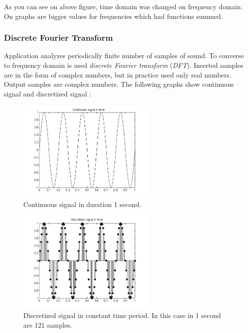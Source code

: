 \documentclass[11pt,titlepage]{article}
\theoremstyle{plain}
\begin{document}
As you can see on above figure, time domain was changed on frequency domain. On graphs are bigger values for frequencies which had functions summed.

\subsubsection{Discrete Fourier Transform}
Application analyzes periodically finite number of samples of sound. To converse to frequency domain is used \textit{discrete Fourier transform} (\textit{DFT}). Inserted samples are in the form of complex numbers, but in practice used only real numbers. Output samples are complex numbers. The following graphs show continuous signal and discretized signal \cite{fourier}:

\begin{figure}[H]
	\centering
	\includegraphics[width=0.6\textwidth]{img/continues}
	\caption{Continuous signal in duration 1 second.}
	\label{fig:F6}
\end{figure}

\begin{figure}[H]
	\centering
	\includegraphics[width=0.6\textwidth]{img/descrete}
	\caption{Discretized signal in constant time period. In this case in 1 second are 121 samples.}
	\label{fig:F7}
\end{figure}
\end{document}
